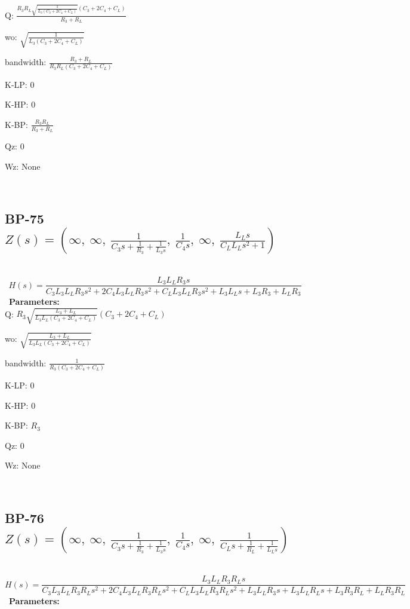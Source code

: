 \documentclass{article}
\begin{document}
Q: $\frac{R_{3} R_{L} \sqrt{\frac{1}{L_{3} \left(C_{3} + 2 C_{4} + C_{L}\right)}} \left(C_{3} + 2 C_{4} + C_{L}\right)}{R_{3} + R_{L}}$\ 

wo: $\sqrt{\frac{1}{L_{3} \left(C_{3} + 2 C_{4} + C_{L}\right)}}$\ 

bandwidth: $\frac{R_{3} + R_{L}}{R_{3} R_{L} \left(C_{3} + 2 C_{4} + C_{L}\right)}$\ 

K-LP: $0$\ 

K-HP: $0$\ 

K-BP: $\frac{R_{3} R_{L}}{R_{3} + R_{L}}$\ 

Qz: $0$\ 

Wz: $\text{None}$\ 

\ 

\subsection{BP-75 $Z(s) = \left( \infty, \  \infty, \  \frac{1}{C_{3} s + \frac{1}{R_{3}} + \frac{1}{L_{3} s}}, \  \frac{1}{C_{4} s}, \  \infty, \  \frac{L_{L} s}{C_{L} L_{L} s^{2} + 1}\right)$ } \ 
\textbf{\[H(s) = \frac{L_{3} L_{L} R_{3} s}{C_{3} L_{3} L_{L} R_{3} s^{2} + 2 C_{4} L_{3} L_{L} R_{3} s^{2} + C_{L} L_{3} L_{L} R_{3} s^{2} + L_{3} L_{L} s + L_{3} R_{3} + L_{L} R_{3}}\] } \ 
\textbf{Parameters:}\\ 

Q: $R_{3} \sqrt{\frac{L_{3} + L_{L}}{L_{3} L_{L} \left(C_{3} + 2 C_{4} + C_{L}\right)}} \left(C_{3} + 2 C_{4} + C_{L}\right)$\ 

wo: $\sqrt{\frac{L_{3} + L_{L}}{L_{3} L_{L} \left(C_{3} + 2 C_{4} + C_{L}\right)}}$\ 

bandwidth: $\frac{1}{R_{3} \left(C_{3} + 2 C_{4} + C_{L}\right)}$\ 

K-LP: $0$\ 

K-HP: $0$\ 

K-BP: $R_{3}$\ 

Qz: $0$\ 

Wz: $\text{None}$\ 

\ 

\subsection{BP-76 $Z(s) = \left( \infty, \  \infty, \  \frac{1}{C_{3} s + \frac{1}{R_{3}} + \frac{1}{L_{3} s}}, \  \frac{1}{C_{4} s}, \  \infty, \  \frac{1}{C_{L} s + \frac{1}{R_{L}} + \frac{1}{L_{L} s}}\right)$ } \ 
\textbf{\[H(s) = \frac{L_{3} L_{L} R_{3} R_{L} s}{C_{3} L_{3} L_{L} R_{3} R_{L} s^{2} + 2 C_{4} L_{3} L_{L} R_{3} R_{L} s^{2} + C_{L} L_{3} L_{L} R_{3} R_{L} s^{2} + L_{3} L_{L} R_{3} s + L_{3} L_{L} R_{L} s + L_{3} R_{3} R_{L} + L_{L} R_{3} R_{L}}\] } \ 
\textbf{Parameters:}\\ 
\end{document}
